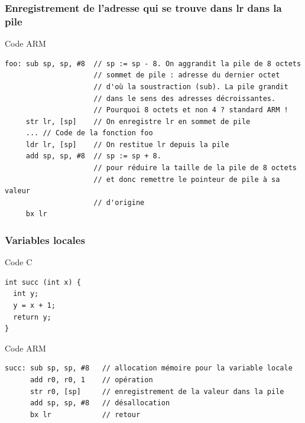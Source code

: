 \documentclass{beamer}
\begin{document}
\begin{frame}[fragile]
  \frametitle{Enregistrement de l'adresse qui se trouve dans lr dans
    la pile}

\begin{block}{Code ARM}
{\small
\begin{lstlisting}[style=arm]                  
foo: sub sp, sp, #8  // sp := sp - 8. On aggrandit la pile de 8 octets
                     // sommet de pile : adresse du dernier octet
                     // d'où la soustraction (sub). La pile grandit
                     // dans le sens des adresses décroissantes.
                     // Pourquoi 8 octets et non 4 ? standard ARM !
     str lr, [sp]    // On enregistre lr en sommet de pile 
     ... // Code de la fonction foo
     ldr lr, [sp]    // On restitue lr depuis la pile 
     add sp, sp, #8  // sp := sp + 8.
                     // pour réduire la taille de la pile de 8 octets
                     // et donc remettre le pointeur de pile à sa valeur
                     // d'origine
     bx lr
\end{lstlisting}}
\end{block}
\end{frame}

\begin{frame}[fragile]
\frametitle{Variables locales}

\begin{block}{Code C}
{\small
\begin{lstlisting}[style=C]
int succ (int x) {
  int y;
  y = x + 1;
  return y;
}
\end{lstlisting}}
\end{block}

\begin{block}{Code ARM}
{\small
\begin{lstlisting}[style=arm]                  
succ: sub sp, sp, #8   // allocation mémoire pour la variable locale
      add r0, r0, 1    // opération
      str r0, [sp]     // enregistrement de la valeur dans la pile
      add sp, sp, #8   // désallocation
      bx lr            // retour
\end{lstlisting}}
\end{block}
\end{frame}
  
\end{document}
